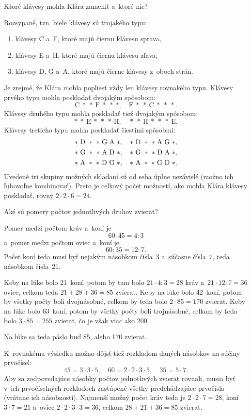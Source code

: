 {%
\napad
Ktoré klávesy mohla Klára zameniť a~ktoré nie?

\riesenie
Rozsypané, tzn. biele klávesy sú trojakého typu:
\begin{enumerate}
  \item klávesy C a~F, ktoré majú čiernu klávesu sprava,
  \item klávesy E a~H, ktoré majú čiernu klávesu zľava,
  \item klávesy D, G a~A, ktoré majú čierne klávesy z~oboch strán.
\end{enumerate}
Je zrejmé, že Klára mohla popliesť vždy len klávesy rovnakého typu.
Klávesy prvého typu mohla poskladať dvojakým spôsobom:
$$
\text{C}\ *\ *\ \text{F}\ *\ *\ *, \quad
\text{F}\ *\ *\ \text{C}\ *\ *\ *.
$$
Klávesy druhého typu mohla poskladať tiež dvojakým spôsobom:
$$
*\ *\ \text{E}\ *\ *\ *\ \text{H}, \quad
*\ *\ \text{H}\ *\ *\ *\ \text{E}.
$$
Klávesy tretieho typu mohla poskladať šiestimi spôsobmi:
$$
\gathered
*\ \text{D}\ *\ *\ \text{G}\ \text{A}\ *, \quad
*\ \text{D}\ *\ *\ \text{A}\ \text{G}\ *, \\
*\ \text{G}\ *\ *\ \text{A}\ \text{D}\ *, \quad
*\ \text{G}\ *\ *\ \text{D}\ \text{A}\ *, \\
*\ \text{A}\ *\ *\ \text{D}\ \text{G}\ *, \quad
*\ \text{A}\ *\ *\ \text{G}\ \text{D}\ {*}.
\endgathered
$$
Uvedené tri skupiny možných skladaní sú od seba úplne nezávislé (možno ich ľubovoľne kombinovať).
Preto je celkový počet možností, ako mohla Klára klávesy poskladať, rovný
$2\cdot2\cdot6=24$.
}

{%
\napad
Aké sú pomery počtov jednotlivých druhov zvierat?

\riesenie
Pomer medzi počtom kráv a~koní je
$$
60:45=4:3
$$
a~pomer medzi počtom oviec a~koní je
$$
60:35=12:7.
$$
Počet koní teda musí byť nejakým násobkom čísla~3 a~súčasne čísla~7, teda
násobkom čísla~21.

Keby na lúke bolo 21~koní, potom by tam bolo $21\cdot4:3=28$ kráv
a~$21\cdot12:7=36$ oviec, celkom teda $21+28+36=85$ zvierat.
Keby na lúke bolo 42~koní, potom by všetky počty boli dvojnásobné, celkom by
teda bolo $2\cdot85=170$ zvierat.
Keby na lúke bolo 63~koní, potom by všetky počty boli trojnásobné, celkom
by teda bolo $3\cdot85=255$ zvierat, čo je však viac ako 200.

Na lúke sa teda páslo buď 85, alebo 170 zvierat.

\poznamka
K~rovnakému výsledku možno dôjsť tiež rozkladom daných násobkov na súčiny prvočísel:
$$
45=3\cdot3\cdot5,\quad
60=2\cdot2\cdot3\cdot5,\quad
35=5\cdot7.
$$
Aby sa zodpovedajúce násobky počtov jednotlivých zvierat rovnali, musia byť
v~ich prvočíselných rozkladoch zastúpené všetky predchádzajúce prvočísla
(vrátane ich násobností).
Najmenší možný počet kráv teda je $2\cdot2\cdot7=28$, koní $3\cdot7=21$
a~oviec $2\cdot2\cdot3\cdot3=36$, celkom $28+21+36=85$ zvierat.
}

